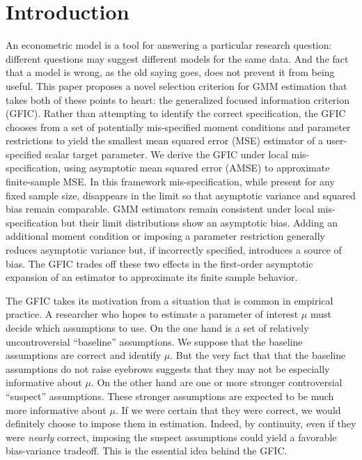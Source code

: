 \section{Introduction}

An econometric model is a tool for answering a particular research question: different questions may suggest different models for the same data. 
And the fact that a model is wrong, as the old saying goes, does not prevent it from being useful. 
This paper proposes a novel selection criterion for GMM estimation that takes both of these points to heart: the generalized focused information criterion (GFIC). 
Rather than attempting to identify the correct specification, the GFIC chooses from a set of potentially mis-specified moment conditions and parameter restrictions to yield the smallest mean squared error (MSE) estimator of a user-specified scalar target parameter. 
We derive the GFIC under local mis-specification, using asymptotic mean squared error (AMSE) to approximate finite-sample MSE. 
In this framework mis-specification, while present for any fixed sample size, disappears in the limit so that asymptotic variance and squared bias remain comparable. 
GMM estimators remain consistent under local mis-specification but their limit distributions show an asymptotic bias. 
Adding an additional moment condition or imposing a parameter restriction generally reduces asymptotic variance but, if incorrectly specified, introduces a source of bias.
The GFIC trades off these two effects in the first-order asymptotic expansion of an estimator to approximate its finite sample behavior.

The GFIC takes its motivation from a situation that is common in empirical practice.
A researcher who hopes to estimate a parameter of interest $\mu$ must decide which assumptions to use.
On the one hand is a set of relatively uncontroversial ``baseline'' assumptions.
We suppose that the baseline assumptions are correct and identify $\mu$.
But the very fact that that the baseline assumptions do not raise eyebrows suggests that they may not be especially informative about $\mu$. 
On the other hand are one or more stronger controversial ``suspect'' assumptions.
These stronger assumptions are expected to be much more informative about $\mu$.
If we were certain that they were correct, we would definitely choose to impose them in estimation.
Indeed, by continuity, even if they were \emph{nearly} correct, imposing the suspect assumptions could yield a favorable bias-variance tradeoff.
This is the essential idea behind the GFIC.

